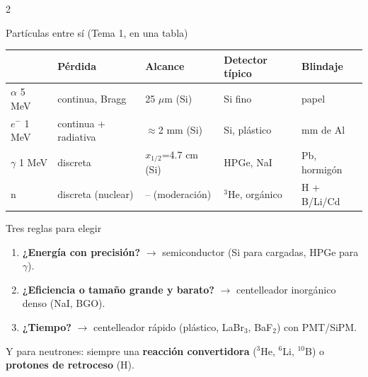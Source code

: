\documentclass[10pt,a4paper,landscape]{article}
\begin{document}
\vspace{2pt}
\begin{multicols}{2}
\begin{caja}{Partículas entre sí (Tema 1, en una tabla)}
\small
\begin{tabular}{@{}lllll@{}}
& Pérdida & Alcance & Detector típico & Blindaje\\\midrule
$\alpha$ 5 MeV & continua, Bragg & 25 $\mu$m (Si) & Si fino & papel\\
$e^-$ 1 MeV & continua + radiativa & $\approx$2 mm (Si) & Si, plástico & mm de Al\\
$\gamma$ 1 MeV & discreta & $x_{1/2}$=4.7 cm (Si) & HPGe, NaI & Pb, hormigón\\
n & discreta (nuclear) & -- (moderación) & $^3$He, orgánico & H + B/Li/Cd\\
\end{tabular}
\end{caja}
\columnbreak
\begin{caja}{Tres reglas para elegir}
\small
\begin{enumerate}
\item \textbf{¿Energía con precisión?} $\to$ semiconductor (Si para cargadas, HPGe para $\gamma$).
\item \textbf{¿Eficiencia o tamaño grande y barato?} $\to$ centelleador inorgánico denso (NaI, BGO).
\item \textbf{¿Tiempo?} $\to$ centelleador rápido (plástico, LaBr$_3$, BaF$_2$) con PMT/SiPM.
\end{enumerate}
Y para neutrones: siempre una \textbf{reacción convertidora} ($^3$He, $^6$Li, $^{10}$B) o \textbf{protones de retroceso} (H).
\end{caja}
\end{multicols}
\end{document}
